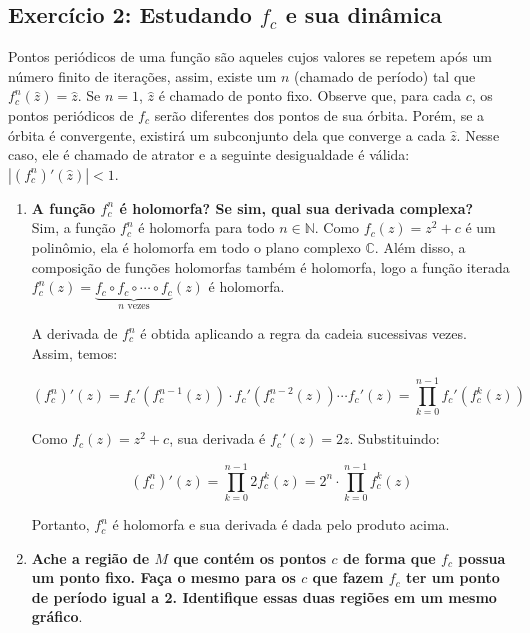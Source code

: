 \subsection*{Exercício 2: Estudando \( f_c \) e sua dinâmica}

Pontos periódicos de uma função são aqueles cujos valores se repetem após um número finito de iterações, assim, existe um \( n \) (chamado de período) tal que \( f_c^n (\hat{z}) = \hat{z} \). Se \( n = 1 \), \( \hat{z} \) é chamado de ponto fixo. Observe que, para cada \( c \), os pontos periódicos de \( f_c \) serão diferentes dos pontos de sua órbita. Porém, se a órbita é convergente, existirá um subconjunto dela que converge a cada \( \hat{z} \). Nesse caso, ele é chamado de atrator e a seguinte desigualdade é válida: \( |(f_c^n)' (\hat{z})| < 1 \).

\begin{enumerate}[label=(\alph*)]
    \item \textbf{A função \( f_c^n \) é holomorfa? Se sim, qual sua derivada complexa?} \\
    
         Sim, a função \( f_c^n \) é holomorfa para todo \( n \in \mathbb{N} \). Como \( f_c(z) = z^2 + c \) é um polinômio, ela é holomorfa em todo o plano complexo \( \mathbb{C} \). Além disso, a composição de funções holomorfas também é holomorfa, logo a função iterada \( f_c^n(z) = \underbrace{f_c \circ f_c \circ \cdots \circ f_c}_{n \text{ vezes}}(z) \) é holomorfa.

        A derivada de \( f_c^n \) é obtida aplicando a regra da cadeia sucessivas vezes. Assim, temos:

        \[
        (f_c^n)'(z) = f_c'(f_c^{n-1}(z)) \cdot f_c'(f_c^{n-2}(z)) \cdots f_c'(z) = \prod_{k=0}^{n-1} f_c'(f_c^k(z))
        \]

        Como \( f_c(z) = z^2 + c \), sua derivada é \( f_c'(z) = 2z \). Substituindo:

        \[
        (f_c^n)'(z) = \prod_{k=0}^{n-1} 2 f_c^k(z) = 2^n \cdot \prod_{k=0}^{n-1} f_c^k(z)
        \]

        Portanto, \( f_c^n \) é holomorfa e sua derivada é dada pelo produto acima.


    \item \textbf{Ache a região de \( M \) que contém os pontos \( c \) de forma que \( f_c \) possua um ponto fixo. Faça o mesmo para os \( c \) que fazem \( f_c \) ter um ponto de período igual a 2. Identifique essas duas regiões em um mesmo gráfico}. \\
    

\end{enumerate}
